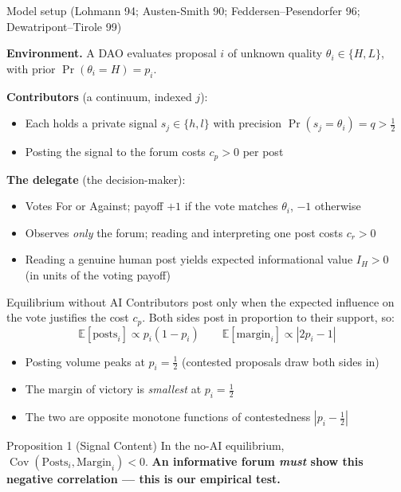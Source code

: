 \documentclass[11pt,aspectratio=169]{beamer}
\begin{document}
\begin{frame}{Model setup}
  \hfill {\small (Lohmann 94; Austen-Smith 90; Feddersen--Pesendorfer 96; Dewatripont--Tirole 99)}
  \vspace{0.2em}

  \textbf{Environment.} A DAO evaluates proposal $i$ of unknown quality
  $\theta_i \in \{H, L\}$, with prior $\Pr(\theta_i = H) = p_i$.
  \vspace{0.4em}

  \textbf{Contributors} (a continuum, indexed $j$):
  \begin{itemize}
    \setlength{\itemsep}{0.3em}
    \item Each holds a private signal $s_j \in \{h, l\}$ with precision
      $\Pr(s_j = \theta_i) = q > \tfrac12$
    \item Posting the signal to the forum costs $c_p > 0$ per post
  \end{itemize}
  \vspace{0.4em}

  \textbf{The delegate} (the decision-maker):
  \begin{itemize}
    \setlength{\itemsep}{0.3em}
    \item Votes For or Against; payoff $+1$ if the vote matches $\theta_i$, $-1$ otherwise
      \hyperlink{appext}{}
    \item Observes \emph{only} the forum; reading and interpreting one post costs $c_r > 0$
    \item Reading a genuine human post yields expected informational value $I_H > 0$\\
      {\small (in units of the voting payoff)}
  \end{itemize}
\end{frame}

\begin{frame}{Equilibrium without AI}
  Contributors post only when the expected influence on the vote justifies the cost
  $c_p$. Both sides post in proportion to their support, so:
  \[
    \mathbb{E}[\text{posts}_i] \propto p_i(1-p_i) \qquad
    \mathbb{E}[\text{margin}_i] \propto |2p_i - 1|
  \]
  \begin{itemize}
    \setlength{\itemsep}{0.4em}
    \item Posting volume peaks at $p_i = \tfrac12$ (contested proposals draw both sides in)
    \item The margin of victory is \emph{smallest} at $p_i = \tfrac12$
    \item The two are opposite monotone functions of contestedness $|p_i - \tfrac12|$
  \end{itemize}
  \vspace{0.5em}
  \begin{block}{Proposition 1 (Signal Content)}
    In the no-AI equilibrium, $\operatorname{Cov}(\text{Posts}_i, \text{Margin}_i) < 0$.
    \textbf{An informative forum \emph{must} show this negative correlation --- this is
    our empirical test.}
  \end{block}
\end{frame}
\end{document}
